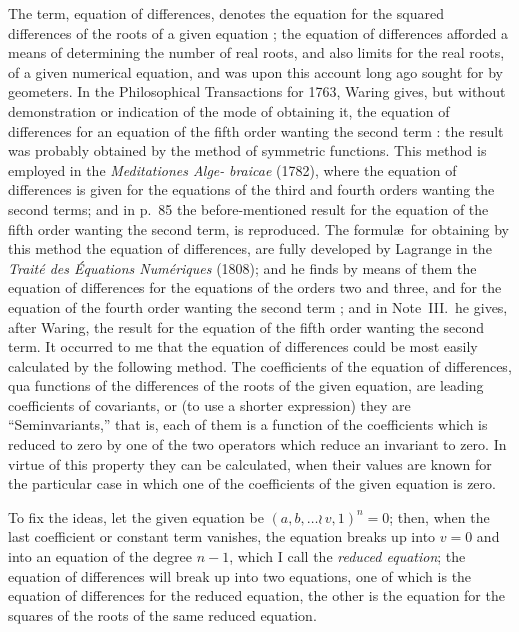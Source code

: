 \documentclass[11pt,a4paper]{book}
\begin{document}
The  term,  equation  of  differences,  denotes  the  equation  for  the  squared  differences
of  the  roots  of  a  given  equation ;  the  equation  of  differences  afforded  a  means  of
determining  the  number  of  real  roots,  and  also  limits  for  the  real  roots,  of  a  given
numerical  equation,  and  was  upon  this  account  long  ago  sought  for  by  geometers.
In  the  Philosophical  Transactions  for  1763,  Waring  gives,  but  without  demonstration
or  indication  of  the  mode  of  obtaining  it,  the  equation  of  differences  for  an  equation
of  the  fifth  order  wanting  the  second  term :  the  result  was  probably  obtained  by  the
method  of  symmetric  functions.  This  method  is  employed  in  the  \textit{Meditationes  Alge-}
\textit{braicae}  (1782),  where  the  equation  of  differences  is  given  for  the  equations  of  the
third  and  fourth  orders  wanting  the  second  terms;  and  in  p.~85  the  before-mentioned
result  for  the  equation  of  the  fifth  order  wanting  the  second  term,  is  reproduced.
The  formul\ae\  for  obtaining  by  this  method  the  equation  of  differences,  are  fully
developed  by  Lagrange  in  the  \textit{Trait\'e  des  \'Equations  Num\'eriques}  (1808);  and  he  finds
by  means  of  them  the  equation  of  differences  for  the  equations  of  the  orders  two  and
three,  and  for  the  equation  of  the  fourth  order  wanting  the  second  term ;  and  in
Note~III.\  he  gives,  after  Waring,  the  result  for  the  equation  of  the  fifth  order  wanting
the  second  term.  It  occurred  to  me  that  the  equation  of  differences  could  be  most
easily  calculated  by  the  following  method.  The  coefficients  of  the  equation  of  differences,
qua    functions    of    the    differences    of    the    roots    of    the    given  equation,   are    leading
coefficients  of  covariants,  or  (to  use  a  shorter  expression)  they  are  ``Seminvariants,''
that  is,  each  of  them  is  a  function  of  the  coefficients  which  is  reduced  to  zero  by  one
of  the  two  operators  which  reduce  an  invariant  to  zero.  In  virtue  of  this  property
they  can  be  calculated,  when  their  values  are  known  for  the  particular  case  in  which
one  of  the  coefficients  of  the  given  equation  is  zero.

To  fix  the  ideas,  let  the  given  equation  be  $(a, b, \ldots \wr\, v,  1)^n = 0$;  then,  when  the
last  coefficient  or  constant  term  vanishes,  the  equation  breaks  up  into  $v = 0$  and  into
an  equation  of  the  degree  $n-1$,  which  I  call  the  \textit{reduced  equation};  the  equation  of
differences  will  break  up  into  two  equations,  one  of  which  is  the  equation  of  differences
for  the  reduced  equation,  the  other  is  the  equation  for  the  squares  of  the  roots  of  the
same  reduced  equation.
\end{document}
